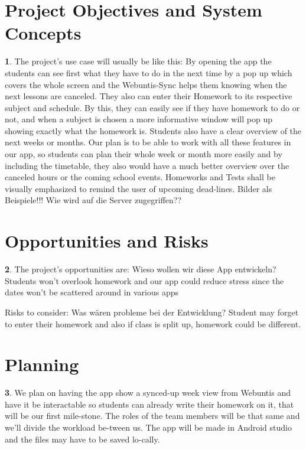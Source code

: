 \documentclass[12pt]{article}
\theoremstyle{definition}
\newtheorem{ourVersion}{ \linebreak}
\begin{document}
\section{Project Objectives and System Concepts}

\begin{ourVersion}
The project’s use case will usually be like this: \linebreak
By opening the app the students can see first what they have to do in the next time by a pop up which covers the whole screen and
the Webuntis-Sync helps them knowing when the next lessons are canceled.
They also can enter their Homework to its respective subject and schedule.
By this, they can easily see if they have homework to do or not, and when a subject is chosen a more informative window will pop up showing exactly what the homework is.
Students also have a clear overview of the next weeks or months. \linebreak
Our plan is to be able to work with all these features in our app, so students can plan their whole week or month more easily and by including the timetable, they also would have a much better overview over the canceled hours or the coming school events.
Homeworks and Tests shall be visually emphasized to remind the user of upcoming dead-lines. \linebreak
Bilder als Beispiele!!!
Wie wird auf die Server zugegriffen??

\end{ourVersion}

\pagebreak
\section{Opportunities and Risks}

 \begin{ourVersion}
The project’s opportunities are: \linebreak
Wieso wollen wir diese App entwickeln? \linebreak
Students won’t overlook homework and our app could reduce stress since the dates won’t be scattered around in various apps \linebreak	

Risks to consider: \linebreak
Was wären probleme bei der Entwicklung?\linebreak
Student may forget to enter their homework and also if class is split up, homework could be different.
	
 \end{ourVersion}


\pagebreak
\section{Planning}

\begin{ourVersion}
We plan on having the app show a synced-up week view from Webuntis and have it be interactable 
so students can already write their homework on it, that will be our first mile-stone. 
The roles of the team members will be that same and we’ll divide the workload be-tween us. 
The app will be made in Android studio and the files may have to be saved lo-cally.
\end{ourVersion}
\end{document}
